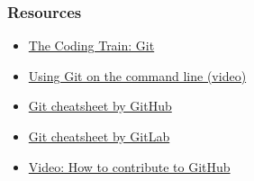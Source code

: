 \documentclass{beamer}
\begin{document}
\begin{frame}
	\frametitle{Resources}

	\begin{itemize}
		\item \href{https://www.youtube.com/watch?v=BCQHnlnPusY&list=PLRqwX-V7Uu6ZF9C0YMKuns9sLDzK6zoiV}{The Coding Train: Git}
		\item \href{https://www.youtube.com/watch?v=USjZcfj8yxE}{Using Git on the command line (video)}
		\item \href{https://education.github.com/git-cheat-sheet-education.pdf}{Git cheatsheet by GitHub}
		\item \href{https://about.gitlab.com/images/press/git-cheat-sheet.pdf}{Git cheatsheet by GitLab}
		\item \href{https://www.youtube.com/watch?v=yr6IzOGoMsQ}{Video: How to contribute to GitHub}
	\end{itemize}
\end{frame}
\end{document}
